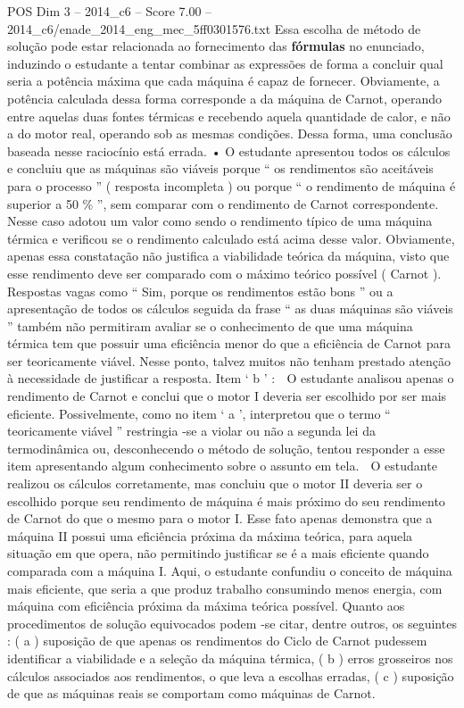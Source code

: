\begin{textsample}{POS Dim 3 – 2014\_c6 – Score 7.00 – 2014\_c6/enade\_2014\_eng\_mec\_5ff0301576.txt}
Essa escolha de método de solução pode estar relacionada ao fornecimento das \textbf{fórmulas} no enunciado, induzindo o estudante a tentar combinar as expressões de forma a concluir qual seria a potência máxima que cada máquina é capaz de fornecer.
Obviamente, a potência calculada dessa forma corresponde a da máquina de Carnot, operando entre aquelas duas fontes térmicas e recebendo aquela quantidade de calor, e não a do motor real, operando sob as mesmas condições.
Dessa forma, uma conclusão baseada nesse raciocínio está errada. • O estudante apresentou todos os cálculos e concluiu que as máquinas são viáveis porque “ os rendimentos são aceitáveis para o processo ” ( resposta incompleta ) ou porque “ o rendimento de máquina é superior a 50 \% ”, sem comparar com o rendimento de Carnot correspondente.
Nesse caso adotou um valor como sendo o rendimento típico de uma máquina térmica e verificou se o rendimento calculado está acima desse valor.
Obviamente, apenas essa constatação não justifica a viabilidade teórica da máquina, visto que esse rendimento deve ser comparado com o máximo teórico possível ( Carnot ).  Respostas vagas como “ Sim, porque os rendimentos estão bons ” ou a apresentação de todos os cálculos seguida da frase “ as duas máquinas são viáveis ” também não permitiram avaliar se o conhecimento de que uma máquina térmica tem que possuir uma eficiência menor do que a eficiência de Carnot para ser teoricamente viável.
Nesse ponto, talvez muitos não tenham prestado atenção à necessidade de justificar a resposta.
Item ‘ b ’ :  O estudante analisou apenas o rendimento de Carnot e conclui que o motor I deveria ser escolhido por ser mais eficiente.
Possivelmente, como no item ‘ a ’, interpretou que o termo “ teoricamente viável ” restringia -se a violar ou não a segunda lei da termodinâmica ou, desconhecendo o método de solução, tentou responder a esse item apresentando algum conhecimento sobre o assunto em tela.  O estudante realizou os cálculos corretamente, mas concluiu que o motor II deveria ser o escolhido porque seu rendimento de máquina é mais próximo do seu rendimento de Carnot do que o mesmo para o motor I.
Esse fato apenas demonstra que a máquina II possui uma eficiência próxima da máxima teórica, para aquela situação em que opera, não permitindo justificar se é a mais eficiente quando comparada com a máquina I.
Aqui, o estudante confundiu o conceito de máquina mais eficiente, que seria a que produz trabalho consumindo menos energia, com máquina com eficiência próxima da máxima teórica possível.
Quanto aos procedimentos de solução equivocados podem -se citar, dentre outros, os seguintes : ( a ) suposição de que apenas os rendimentos do Ciclo de Carnot pudessem identificar a viabilidade e a seleção da máquina térmica, ( b ) erros grosseiros nos cálculos associados aos rendimentos, o que leva a escolhas erradas, ( c ) suposição de que as máquinas reais se comportam como máquinas de Carnot.

\end{textsample}
